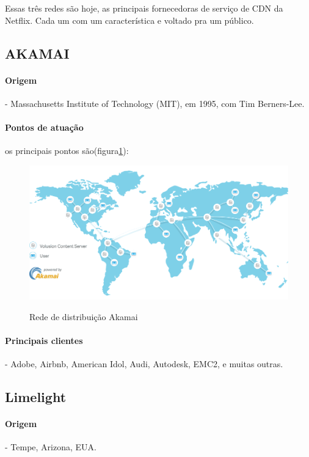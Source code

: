 Essas tr\^es redes s\~ao hoje, as principais fornecedoras de servi\c{c}o de CDN da Netflix. Cada um com um caracter\'istica e voltado pra um p\'ublico.
\subsection{AKAMAI}
\paragraph{Origem}- Massachusetts Institute of Technology (MIT), em 1995, com Tim Berners-Lee.
\paragraph{Pontos de atua\c{c}\~ao} os principais pontos s\~ao(figura\ref{figura:akamai_map}):
\begin{figure}[H]
\caption{Rede de distribui\c{c}\~ao Akamai}
\includegraphics[width=14cm]{Figuras/akamai_map.png} 
\label{figura:akamai_map}
\end{figure}
\paragraph{Principais clientes}- Adobe, Airbnb, American Idol, Audi, Autodesk, EMC2, e muitas outras.
\subsection{Limelight}
\paragraph{Origem}- Tempe, Arizona, EUA.
